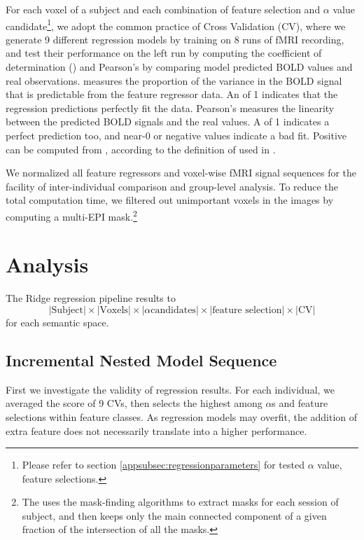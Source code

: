 For each voxel of a subject and each combination of feature selection and \(\alpha\) value candidate\footnote{Please refer to section \ref{appsubsec:regressionparameters} for tested \(\alpha\) value, feature selections.}, we adopt the common practice of Cross Validation (CV), where we generate 9 different regression models by training on 8 runs of fMRI recording, and test their performance on the left run by computing the coefficient of determination () and Pearson's  by comparing model predicted BOLD values and real observations.  measures the proportion of the variance in the BOLD signal that is predictable from the feature regressor data. An  of 1 indicates that the regression predictions perfectly fit the data. Pearson's  measures the linearity between the predicted BOLD signals and the real values. A  of 1 indicates a perfect prediction too, and near-0 or negative values indicate a bad fit. Positive  can be computed from , according to the definition of  used in .

We normalized all feature regressors and voxel-wise fMRI signal sequences for the facility of inter-individual comparison and group-level analysis. To reduce the total computation time, we filtered out unimportant voxels in the images by computing a multi-EPI mask.\footnote{The  uses the mask-finding algorithms to extract masks for each session of subject, and then keeps only the main connected component of a given fraction  of the intersection of all the masks.}

\section{Analysis}

The Ridge regression pipeline results to \[ \lvert \text{Subject} \rvert \times \lvert \text{Voxels} \rvert \times \lvert \alpha \text{candidates} \rvert \times \lvert \text{feature selection} \rvert \times \lvert \text{CV} \rvert \] for each semantic space. 


\subsection{Incremental Nested Model Sequence}

First we investigate the validity of regression results. For each individual, we averaged the  score of 9 CVs, then selects the highest  among \(\alpha\)s and feature selections within feature classes. As regression models may overfit, the addition of extra feature does not necessarily translate into a higher performance.

